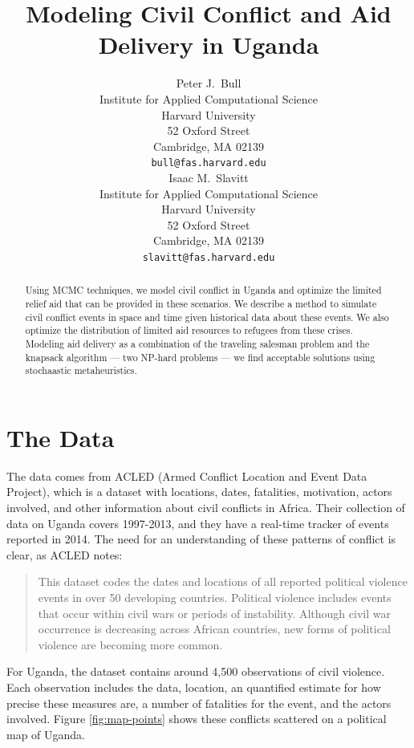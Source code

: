 \documentclass{article} %
\title{Modeling Civil Conflict and Aid Delivery in Uganda}
\author{
Peter J.~Bull \\
Institute for Applied Computational Science\\
Harvard University\\
52 Oxford Street \\
Cambridge, MA 02139 \\
\texttt{bull@fas.harvard.edu} \\
\And
Isaac M.~Slavitt \\
Institute for Applied Computational Science\\
Harvard University\\
52 Oxford Street \\
Cambridge, MA 02139 \\
\texttt{slavitt@fas.harvard.edu} \\
}
\begin{document}
\maketitle

\begin{abstract}
Using MCMC techniques, we model civil conflict in Uganda and optimize the limited relief aid that can be provided in these scenarios. We describe a method to simulate civil conflict events in space and time given historical data about these events. We also optimize the distribution of limited aid resources to refugees from these crises. Modeling aid delivery as a combination of the traveling salesman problem and the knapsack algorithm --- two NP-hard problems --- we find acceptable solutions using stochaastic metaheuristics.
\end{abstract}

\section*{The Data}

The data comes from ACLED (Armed Conflict Location and Event Data Project), which is a dataset with locations, dates, fatalities, motivation, actors involved, and other information about civil conflicts in Africa. Their collection of data on Uganda covers 1997-2013, and they have a real-time tracker of events reported in 2014.\cite{ACLED} The need for an understanding of these patterns of conflict is clear, as ACLED notes:

\begin{quote}
This dataset codes the dates and locations of all reported political violence events in over 50 developing countries. Political violence includes events that occur within civil wars or periods of instability. Although civil war occurrence is decreasing across African countries, new forms of political violence are becoming more common.
\end{quote}

For Uganda, the dataset contains around 4,500 observations of civil violence. Each observation includes the data, location, an quantified estimate for how precise these measures are, a number of fatalities for the event, and the actors involved. Figure \ref{fig:map-points} shows these conflicts scattered on a political map of Uganda.
\end{document}
